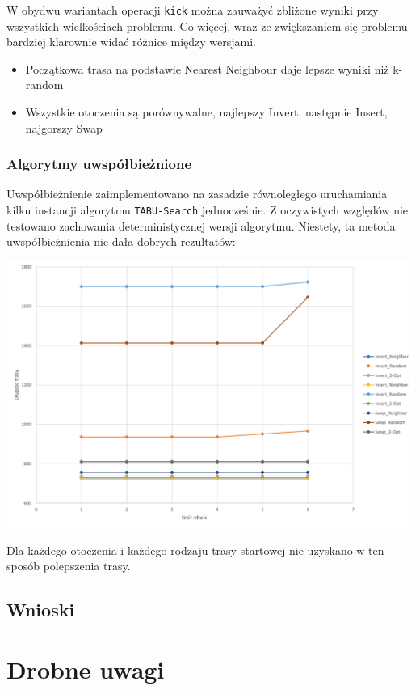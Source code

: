 \documentclass{article}
\begin{document}
W obydwu wariantach operacji \texttt{kick} można zauważyć zbliżone wyniki przy wszystkich wielkościach problemu. Co więcej, wraz ze zwiększaniem się problemu bardziej klarownie widać różnice między wersjami. 
\begin{itemize}
	\item Początkowa trasa na podstawie Nearest Neighbour daje lepsze wyniki niż k-random
	\item Wszystkie otoczenia są porównywalne, najlepszy Invert, następnie Insert, najgorszy Swap
\end{itemize}


\subsubsection{Algorytmy uwspółbieżnione}

Uwspółbieżnienie zaimplementowano na zasadzie równoległego uruchamiania kilku instancji algorytmu \texttt{TABU-Search} jednocześnie. Z oczywistych względów nie testowano zachowania deterministycznej wersji algorytmu. Niestety, ta metoda uwspółbieżnienia nie dała dobrych rezultatów:

\includegraphics[scale=0.4]{parallel_n=70}

Dla każdego otoczenia i każdego rodzaju trasy startowej nie uzyskano w ten sposób polepszenia trasy.



\subsection{Wnioski}


\section*{Drobne uwagi}
\end{document}
